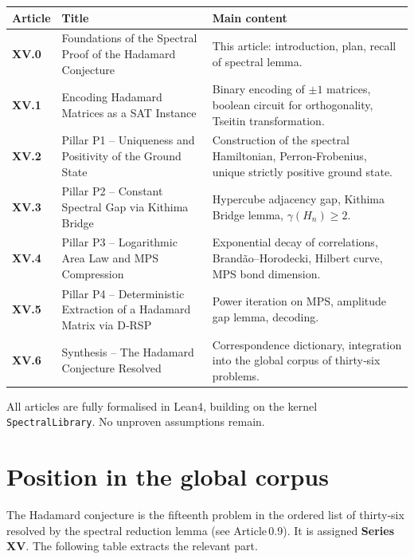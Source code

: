 \documentclass[11pt,a4paper]{article}
\begin{document}
\begin{center}
\small
\begin{tabular}{@{}>{\bfseries}l>{\raggedright\arraybackslash}p{4.5cm}>{\raggedright\arraybackslash}p{6cm}@{}}
\toprule
\textbf{Article} & \textbf{Title} & \textbf{Main content} \\
\midrule
XV.0 & Foundations of the Spectral Proof of the Hadamard Conjecture & This article: introduction, plan, recall of spectral lemma. \\
XV.1 & Encoding Hadamard Matrices as a SAT Instance & Binary encoding of $\pm1$ matrices, boolean circuit for orthogonality, Tseitin transformation. \\
XV.2 & Pillar P1 – Uniqueness and Positivity of the Ground State & Construction of the spectral Hamiltonian, Perron‑Frobenius, unique strictly positive ground state. \\
XV.3 & Pillar P2 – Constant Spectral Gap via Kithima Bridge & Hypercube adjacency gap, Kithima Bridge lemma, $\gamma(H_n)\ge2$. \\
XV.4 & Pillar P3 – Logarithmic Area Law and MPS Compression & Exponential decay of correlations, Brandão–Horodecki, Hilbert curve, MPS bond dimension. \\
XV.5 & Pillar P4 – Deterministic Extraction of a Hadamard Matrix via D‑RSP & Power iteration on MPS, amplitude gap lemma, decoding. \\
XV.6 & Synthesis – The Hadamard Conjecture Resolved & Correspondence dictionary, integration into the global corpus of thirty‑six problems. \\
\bottomrule
\end{tabular}
\normalsize
\end{center}

All articles are fully formalised in Lean4, building on the kernel \texttt{SpectralLibrary}. No unproven assumptions remain.

\section{Position in the global corpus}

The Hadamard conjecture is the fifteenth problem in the ordered list of thirty‑six resolved by the spectral reduction lemma (see Article 0.9). It is assigned \textbf{Series XV}. The following table extracts the relevant part.
\end{document}
